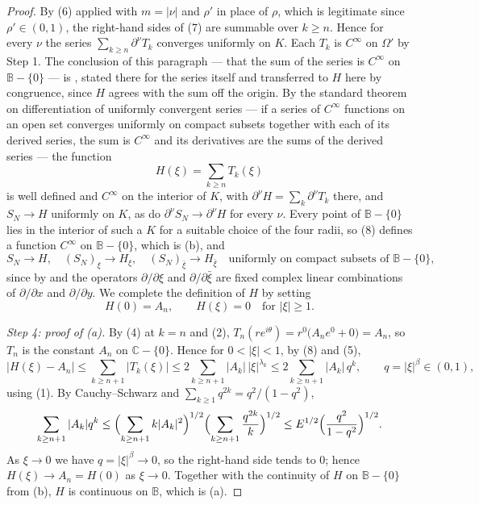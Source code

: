 \begin{proof}
By (6) applied with $m=|\nu|$ and $\rho'$ in place of $\rho$, which is
legitimate since $\rho'\in(0,1)$, the right-hand sides of (7) are summable over
$k\ge n$.
Hence for every $\nu$ the series $\sum_{k\ge n}\partial^{\nu}T_k$ converges
uniformly on $K$.  Each $T_k$ is $C^\infty$ on $\Omega'$ by Step 1.  The
conclusion of this paragraph --- that the sum of the series is $C^\infty$ on
$\mathbb{B}-\{0\}$ --- is , stated there for
the series itself and transferred to $H$ here by congruence, since $H$ agrees
with the sum off the origin.  By the standard theorem on differentiation of
uniformly convergent series --- if a series of $C^\infty$ functions on an open
set converges uniformly on compact subsets together with each of its derived
series, the sum is $C^\infty$ and its derivatives are the sums of the derived
series --- the function
\begin{equation}\tag{8}
  H(\xi)=\sum_{k\ge n}T_k(\xi)
\end{equation}
is well defined and $C^\infty$ on the interior of $K$, with
$\partial^{\nu}H=\sum_k\partial^{\nu}T_k$ there, and $S_N\to H$ uniformly on
$K$, as do $\partial^{\nu}S_N\to\partial^{\nu}H$ for every $\nu$.
Every point of $\mathbb{B}-\{0\}$ lies in the interior of such a $K$ for a
suitable choice of the four radii, so
(8) defines a function $C^\infty$ on $\mathbb{B}-\{0\}$, which is (b), and
\begin{equation}\tag{9}
  S_N\to H,\quad (S_N)_\xi\to H_\xi,\quad (S_N)_{\bar\xi}\to H_{\bar\xi}
  \quad\text{uniformly on compact subsets of }\mathbb{B}-\{0\},
\end{equation}
since by  and  the operators
$\partial/\partial\xi$ and $\partial/\partial\bar\xi$ are fixed complex linear
combinations of $\partial/\partial x$ and $\partial/\partial y$.  We complete
the definition of $H$ by setting
\[
  H(0)=A_n,\qquad H(\xi)=0\quad\text{for }|\xi|\ge1 .
\]

\emph{Step 4: proof of (a).}  By (4) at $k=n$ and (2),
$T_n(re^{i\theta})=r^{0}\bigl(A_ne^{0}+0\bigr)=A_n$, so $T_n$ is the constant
$A_n$ on $\mathbb{C}-\{0\}$.  Hence for $0<|\xi|<1$, by (8) and (5),
\[
  \bigl|H(\xi)-A_n\bigr|\le\sum_{k\ge n+1}|T_k(\xi)|
  \le2\sum_{k\ge n+1}|A_k|\,|\xi|^{\lambda_k}
  \le2\sum_{k\ge n+1}|A_k|\,q^{k},\qquad q=|\xi|^{\beta}\in(0,1),
\]
using (1).  By Cauchy--Schwarz and $\sum_{k\ge1}q^{2k}=q^2/(1-q^2)$,
\[
  \sum_{k\ge n+1}|A_k|q^{k}
  \le\Bigl(\sum_{k\ge n+1}k|A_k|^2\Bigr)^{1/2}
    \Bigl(\sum_{k\ge n+1}\frac{q^{2k}}{k}\Bigr)^{1/2}
  \le E^{1/2}\Bigl(\frac{q^2}{1-q^2}\Bigr)^{1/2}.
\]
As $\xi\to0$ we have $q=|\xi|^{\beta}\to0$, so the right-hand side tends to
$0$; hence $H(\xi)\to A_n=H(0)$ as $\xi\to0$.  Together with the continuity of
$H$ on $\mathbb{B}-\{0\}$ from (b), $H$ is continuous on $\mathbb{B}$, which is
(a).


\end{proof}

